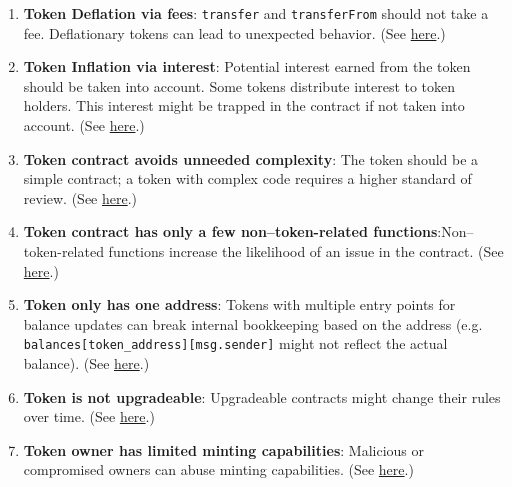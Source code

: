 \begin{enumerate}
\item\textbf{Token Deflation via fees}: \verb|transfer| and \verb|transferFrom| should not take a fee. Deflationary tokens can lead to unexpected behavior. (See \href{https://github.com/crytic/building-secure-contracts/blob/master/development-guidelines/token\_integration.md\#erc-conformity}{here}.)

\item\textbf{Token Inflation via interest}: Potential interest earned from the token should be taken into account. Some tokens distribute interest to token holders. This interest might be trapped in the contract if not taken into account. (See \href{https://github.com/crytic/building-secure-contracts/blob/master/development-guidelines/token\_integration.md\#erc-conformity}{here}.)

\item\textbf{Token contract avoids unneeded complexity}: The token should be a simple contract; a token with complex code requires a higher standard of review. (See \href{https://github.com/crytic/building-secure-contracts/blob/master/development-guidelines/token\_integration.md\#contract-composition}{here}.)

\item\textbf{Token contract has only a few non–token-related functions}:\linebreak Non–token-related functions increase the likelihood of an issue in the contract. (See \href{https://github.com/crytic/building-secure-contracts/blob/master/development-guidelines/token\_integration.md\#contract-composition}{here}.)

\item\textbf{Token only has one address}: Tokens with multiple entry points for balance updates can break internal bookkeeping based on the address (e.g. \verb|balances[token_address][msg.sender]| might not reflect the actual balance). (See \href{https://github.com/crytic/building-secure-contracts/blob/master/development-guidelines/token\_integration.md\#contract-composition}{here}.)

\item\textbf{Token is not upgradeable}: Upgradeable contracts might change their rules over time. (See \href{https://github.com/crytic/building-secure-contracts/blob/master/development-guidelines/token\_integration.md\#owner-privileges}{here}.)

\item\textbf{Token owner has limited minting capabilities}: Malicious or compromised owners can abuse minting capabilities. (See \href{https://github.com/crytic/building-secure-contracts/blob/master/development-guidelines/token\_integration.md\#owner-privileges}{here}.)


\end{enumerate}
